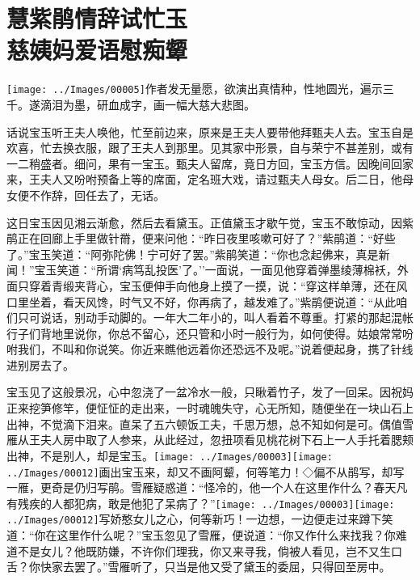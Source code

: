 
\chapter{慧紫鹃情辞试忙玉\\慈姨妈爱语慰痴颦}

{\texttt{[image: ../Images/00005]}作者发无量愿，欲演出真情种，性地圆光，遍示三千。遂滴泪为墨，研血成字，画一幅大慈大悲图。}

话说宝玉听王夫人唤他，忙至前边来，原来是王夫人要带他拜甄夫人去。宝玉自是欢喜，忙去换衣服，跟了王夫人到那里。见其家中形景，自与荣宁不甚差别，或有一二稍盛者。细问，果有一宝玉。甄夫人留席，竟日方回，宝玉方信。因晚间回家来，王夫人又吩咐预备上等的席面，定名班大戏，请过甄夫人母女。后二日，他母女便不作辞，回任去了，无话。

这日宝玉因见湘云渐愈，然后去看黛玉。正值黛玉才歇午觉，宝玉不敢惊动，因紫鹃正在回廊上手里做针黹，便来问他：``昨日夜里咳嗽可好了？''紫鹃道：``好些了。''宝玉笑道：``阿弥陀佛！宁可好了罢。''紫鹃笑道：``你也念起佛来，真是新闻！''宝玉笑道：``所谓`病笃乱投医'了。''一面说，一面见他穿着弹墨绫薄棉袄，外面只穿着青缎夹背心，宝玉便伸手向他身上摸了一摸，说：``穿这样单薄，还在风口里坐着，看天风馋，时气又不好，你再病了，越发难了。''紫鹃便说道：``从此咱们只可说话，别动手动脚的。一年大二年小的，叫人看着不尊重。打紧的那起混帐行子们背地里说你，你总不留心，还只管和小时一般行为，如何使得。姑娘常常吩咐我们，不叫和你说笑。你近来瞧他远着你还恐远不及呢。''说着便起身，携了针线进别房去了。

宝玉见了这般景况，心中忽浇了一盆冷水一般，只瞅着竹子，发了一回呆。因祝妈正来挖笋修竿，便怔怔的走出来，一时魂魄失守，心无所知，随便坐在一块山石上出神，不觉滴下泪来。直呆了五六顿饭工夫，千思万想，总不知如何是可。偶值雪雁从王夫人房中取了人参来，从此经过，忽扭项看见桃花树下石上一人手托着腮颊出神，不是别人，却是宝玉。{\texttt{[image: ../Images/00003]}\texttt{[image: ../Images/00012]}\footnotesize \kaishu 画出宝玉来，却又不画阿颦，何等笔力！◇偏不从鹃写，却写一雁，更奇是仍归写鹃。}雪雁疑惑道：``怪冷的，他一个人在这里作什么？春天凡有残疾的人都犯病，敢是他犯了呆病了？''{\texttt{[image: ../Images/00003]}\texttt{[image: ../Images/00012]}\footnotesize \kaishu 写娇憨女儿之心，何等新巧！}一边想，一边便走过来蹲下笑道：``你在这里作什么呢？''宝玉忽见了雪雁，便说道：``你又作什么来找我？你难道不是女儿？他既防嫌，不许你们理我，你又来寻我，倘被人看见，岂不又生口舌？你快家去罢了。''雪雁听了，只当是他又受了黛玉的委屈，只得回至房中。

